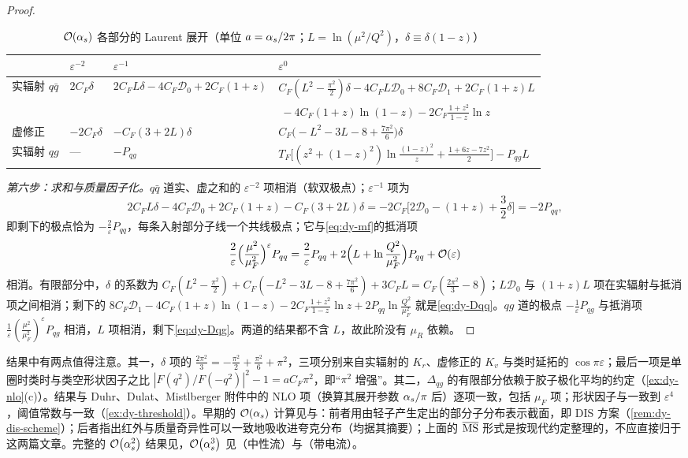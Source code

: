 \begin{proof}
\begin{table}[htbp]
\centering
\caption{$\mathcal{O}\!\left(\alpha_s\right)$ 各部分的 Laurent 展开（单位 $a=\alpha_s/2\pi$；$L=\ln(\mu^2/Q^2)$，$\delta\equiv\delta(1-z)$）}
\label{tab:dy-laurent}
\footnotesize
\setlength{\tabcolsep}{4pt}
\begin{tabular}{@{}llll@{}}
\toprule
 & $\varepsilon^{-2}$ & $\varepsilon^{-1}$ & $\varepsilon^0$\\
\midrule
实辐射 $q\bar q$ & $2C_F\delta$ & $2C_FL\delta-4C_F\mathcal D_0+2C_F(1+z)$ & $C_F(L^2-\frac{\pi^2}{2})\delta-4C_FL\mathcal D_0+8C_F\mathcal D_1+2C_F(1+z)L$\\
 & & & $\ -4C_F(1+z)\ln(1-z)-2C_F\frac{1+z^2}{1-z}\ln z$\\
虚修正 & $-2C_F\delta$ & $-C_F(3+2L)\delta$ & $C_F\big(-L^2-3L-8+\frac{7\pi^2}{6}\big)\delta$\\
实辐射 $qg$ & --- & $-P_{qg}$ & $T_F\big[(z^2+(1-z)^2)\ln\frac{(1-z)^2}{z}+\frac{1+6z-7z^2}{2}\big]-P_{qg}L$\\
\bottomrule
\end{tabular}
\end{table}

\emph{第六步：求和与质量因子化。}$q\bar q$ 道实、虚之和的 $\varepsilon^{-2}$ 项相消（软双极点）；$\varepsilon^{-1}$ 项为
\[
2C_FL\delta-4C_F\mathcal D_0+2C_F(1+z)-C_F(3+2L)\delta=-2C_F\Big[2\mathcal D_0-(1+z)+\frac32\delta\Big]=-2P_{qq},
\]
即剩下的极点恰为 $-\frac2\varepsilon P_{qq}$，每条入射部分子线一个共线极点；它与\cref{eq:dy-mf}的抵消项
\[
\frac2\varepsilon\Big(\frac{\mu^2}{\mu_F^2}\Big)^{\varepsilon}P_{qq}=\frac2\varepsilon P_{qq}+2\Big(L+\ln\frac{Q^2}{\mu_F^2}\Big)P_{qq}+\mathcal{O}\!\left(\varepsilon\right)
\]
相消。有限部分中，$\delta$ 的系数为 $C_F(L^2-\frac{\pi^2}2)+C_F(-L^2-3L-8+\frac{7\pi^2}6)+3C_FL=C_F(\frac{2\pi^2}3-8)$；$L\mathcal D_0$ 与 $(1+z)L$ 项在实辐射与抵消项之间相消；剩下的 $8C_F\mathcal D_1-4C_F(1+z)\ln(1-z)-2C_F\frac{1+z^2}{1-z}\ln z+2P_{qq}\ln\frac{Q^2}{\mu_F^2}$ 就是\cref{eq:dy-Dqq}。$qg$ 道的极点 $-\frac1\varepsilon P_{qg}$ 与抵消项 $\frac1\varepsilon(\frac{\mu^2}{\mu_F^2})^\varepsilon P_{qg}$ 相消，$L$ 项相消，剩下\cref{eq:dy-Dqg}。两道的结果都不含 $L$，故此阶没有 $\mu_R$ 依赖。
\end{proof}

结果中有两点值得注意。其一，$\delta$ 项的 $\frac{2\pi^2}3=-\frac{\pi^2}2+\frac{\pi^2}6+\pi^2$，三项分别来自实辐射的 $K_r$、虚修正的 $K_v$ 与类时延拓的 $\cos\pi\varepsilon$；最后一项是单圈时类时与类空形状因子之比 $|F(q^2)/F(-q^2)|^2-1=aC_F\pi^2$，即“$\pi^2$ 增强”。其二，$\Delta_{qg}$ 的有限部分依赖于胶子极化平均的约定（\cref{ex:dy-nlo}(c)）。结果与 Duhr、Dulat、Mistlberger 附件中的 NLO 项（换算其展开参数 $\alpha_s/\pi$ 后）逐项一致，包括 $\mu_F$ 项\cite{Duhr:2020sdp}；形状因子与\cite{MochVermaserenVogt2005}一致到 $\varepsilon^4$，阈值常数与\cite{Moch:2005ky}一致（\cref{ex:dy-threshold}）。早期的 $\mathcal{O}\!\left(\alpha_s\right)$ 计算见\cite{AltarelliEllisMartinelli1979}与\cite{KubarAndrePaige1979}：前者用由轻子产生定出的部分子分布表示截面，即 DIS 方案（\cref{rem:dy-dis-scheme}）；后者指出红外与质量奇异性可以一致地吸收进夸克分布（均据其摘要）；上面的 $\overline{\mathrm{MS}}$ 形式是按现代约定整理的，不应直接归于这两篇文章。完整的 $\mathcal{O}\!\left(\alpha_s^2\right)$ 结果见\cite{HambergVanNeervenMatsuura1991}，$\mathcal{O}\!\left(\alpha_s^3\right)$ 见\cite{Duhr:2020seh}（中性流）与\cite{Duhr:2020sdp}（带电流）。

